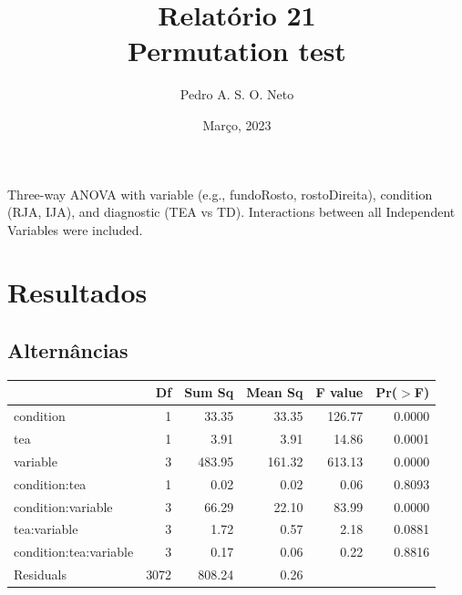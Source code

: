 \documentclass{article}
\title{Relatório 21 \\ Permutation test}
\author{Pedro A. S. O. Neto}
\date{Março, 2023}
\begin{document}
\maketitle


Three-way ANOVA with variable (e.g., fundoRosto, rostoDireita), condition (RJA, IJA), and diagnostic (TEA vs TD).
Interactions between all Independent Variables were included.

\section{Resultados}

\subsection{Alternâncias}

\begin{table}[ht]
\centering
\begin{tabular}{lrrrrr}
  \hline
 & Df & Sum Sq & Mean Sq & F value & Pr($>$F) \\ 
  \hline
condition              & 1 & 33.35 & 33.35 & 126.77 & 0.0000 \\ 
  tea                    & 1 & 3.91 & 3.91 & 14.86 & 0.0001 \\ 
  variable               & 3 & 483.95 & 161.32 & 613.13 & 0.0000 \\ 
  condition:tea          & 1 & 0.02 & 0.02 & 0.06 & 0.8093 \\ 
  condition:variable     & 3 & 66.29 & 22.10 & 83.99 & 0.0000 \\ 
  tea:variable           & 3 & 1.72 & 0.57 & 2.18 & 0.0881 \\ 
  condition:tea:variable & 3 & 0.17 & 0.06 & 0.22 & 0.8816 \\ 
  Residuals              & 3072 & 808.24 & 0.26 &  &  \\ 
   \hline
\end{tabular}
\end{table}
\end{document}
